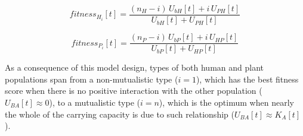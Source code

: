 \documentclass[
]{book}
\begin{document}
\begin{equation}
\tag{Eq. 15}
fitness_{H_{i}}[t]=\frac{(n_{H}-i)\,U_{bH}[t]+i\,U_{PH}[t]}{U_{bH}[t]+U_{PH}[t]}
\end{equation}

\begin{equation}
\tag{Eq. 16}
fitness_{P_{i}}[t]=\frac{(n_{P}-i)\,U_{bP}[t]+i\,U_{HP}[t]}{U_{bP}[t]+U_{HP}[t]}
\end{equation}

As a consequence of this model design, types of both human and plant populations span from a non-mutualistic type (\(i=1\)), which has the best fitness score when there is no positive interaction with the other population (\(U_{BA}[t]\approx 0\)), to a mutualistic type (\(i=n\)), which is the optimum when nearly the whole of the carrying capacity is due to such relationship (\(U_{BA}[t]\approx K_{A}[t]\)).
\end{document}
